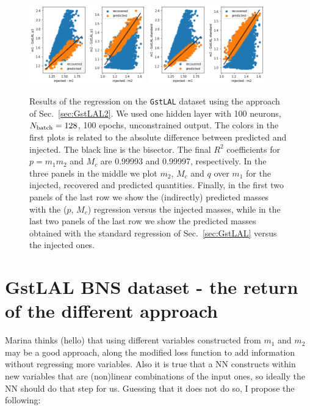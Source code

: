 \documentclass[prd,aps,twocolumn,a4paper,showkeys,nofootinbib]{article}
\begin{document}
\begin{figure}[]
  \includegraphics[width=0.45\textwidth]{./Figs/GstLAL_p_m1m2.png}
  \hspace{1.3cm}
  \includegraphics[width=0.45\textwidth]{./Figs/GstLAL_standard_m1m2.png}
  \caption{\label{fig:GstLAL2_results} Results of the regression on the \texttt{GstLAL}
  dataset using the approach of Sec.~\ref{sec:GstLAL2}. 
  We used one hidden layer with 100 neurons, $N_{\rm batch}=128$, 100 epochs,  
  unconstrained output.
  The colors in the first plots is related to the absolute difference between predicted 
  and injected. The black line is the bisector.
  The final $R^2$ coefficients for $p=m_1 m_2$ and $M_c$ are 0.99993 and 0.99997,
  respectively.
  In the three panels in the middle we plot $m_2$, $M_c$ and $q$ over $m_1$ for 
  the injected, recovered and predicted quantities.
  Finally, in the first two panels of the last row we show the (indirectly) predicted masses 
  with the ($p$, $M_c$) regression versus the injected masses, 
  while in the last two panels of the last row we show the 
  predicted masses obtained with the standard regression of Sec.~\ref{sec:GstLAL} versus 
  the injected ones.}
\end{figure}

\section{GstLAL BNS dataset - the return of the different approach}
\label{sec:GstLAL3}
Marina thinks (hello) that using different variables constructed from $m_1$ and $m_2$ may be a good approach, along the modified loss function to add information without regressing more variables. Also it is true that a NN constructs within new variables that are (non)linear combinations of the input ones, so ideally the NN should do that step for us. Guessing that it does not do so, I propose the following:
\end{document}
